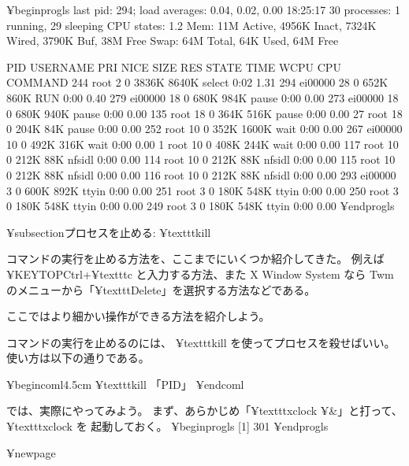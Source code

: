 ¥begin{progls}
last pid:   294;  load averages:  0.04,  0.02,  0.00                   18:25:17
30 processes:  1 running, 29 sleeping
CPU states:  1.2%
Mem: 11M Active, 4956K Inact, 7324K Wired, 3790K Buf, 38M Free
Swap: 64M Total, 64K Used, 64M Free

  PID USERNAME PRI NICE SIZE    RES STATE    TIME   WCPU    CPU COMMAND
  244 root      2   0  3836K  8640K select   0:02  1.31%
  294 ei00000  28   0   652K   860K RUN      0:00  0.40%
  279 ei00000  18   0   680K   984K pause    0:00  0.00%
  273 ei00000  18   0   680K   940K pause    0:00  0.00%
  135 root     18   0   364K   516K pause    0:00  0.00%
   27 root     18   0   204K    84K pause    0:00  0.00%
  252 root     10   0   352K  1600K wait     0:00  0.00%
  267 ei00000  10   0   492K   316K wait     0:00  0.00%
    1 root     10   0   408K   244K wait     0:00  0.00%
  117 root     10   0   212K    88K nfsidl   0:00  0.00%
  114 root     10   0   212K    88K nfsidl   0:00  0.00%
  115 root     10   0   212K    88K nfsidl   0:00  0.00%
  116 root     10   0   212K    88K nfsidl   0:00  0.00%
  293 ei00000   3   0   600K   892K ttyin    0:00  0.00%
  251 root      3   0   180K   548K ttyin    0:00  0.00%
  250 root      3   0   180K   548K ttyin    0:00  0.00%
  249 root      3   0   180K   548K ttyin    0:00  0.00%
¥end{progls}


¥subsection{プロセスを止める: ¥texttt{kill}}

コマンドの実行を止める方法を、ここまでにいくつか紹介してきた。
例えば ¥KEYTOP{Ctrl}+¥texttt{c} と入力する方法、また X Window System なら
Twm のメニューから「¥texttt{Delete}」を選択する方法などである。

ここではより細かい操作ができる方法を紹介しよう。

コマンドの実行を止めるのには、 ¥texttt{kill} を使ってプロセスを殺せばいい。
使い方は以下の通りである。

¥begin{coml}{4.5cm}
¥texttt{kill} 「PID」
¥end{coml}

では、実際にやってみよう。
まず、あらかじめ「¥texttt{xclock ¥&}」と打って、 ¥texttt{xclock} を
起動しておく。
¥begin{progls}
[1] 301
%
¥end{progls}

¥newpage

